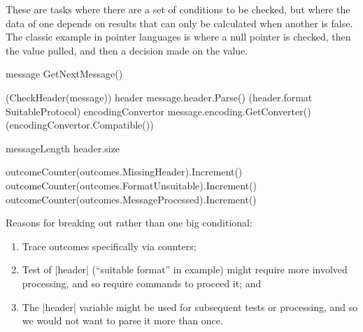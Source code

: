 \documentclass[10pt]{amsart}
\begin{document}
These are tasks where there are a set of conditions to be checked, but
where the data of one depends on results that can only be calculated
when another is false.  The classic example in pointer languages is
where a null pointer is checked, then the value pulled, and then a
decision made on the value.
\begin{codex}
\begin{offsideBlue}
\begin{PVerbatim}
  \ckw[block]\cop[:]
      message \cop[:=] GetNextMessage()

      \ckw[if] (\cop[!]CheckHeader(message))\cop[:]
          \cgoto\csituation[MissingHeader]
      \cend
      header \cop[:=] message.header.Parse()
      \ckw[if] (header.format \cop[!=] SuitableProtocol)\cop[:]
          \cgoto\csituation[FormatUnsuitable]
      \cend
      encodingConvertor \cop[:=] message.encoding.GetConverter()
      \ckw[if] (\cop[!]encodingConvertor.Compatible())\cop[:]
          \cgoto\csituation[FormatUnsuitable]
      \cend

      messageLength \cop[:=] header.size          

      \cgoto\csituation[MessageProcessed]

  \csitop\csituation[MissingHeader]\cop[:]
      outcomeCounter(outcomes.MissingHeader).Increment()
  \csitop\csituation[*.FormatUnsuitable]\cop[:]
      outcomeCounter(outcomes.FormatUnsuitable).Increment()
  \csitop\csituation[MessageProcessed]\cop[:]
      outcomeCounter(outcomes.MessageProcessed).Increment()
  \cend
\end{PVerbatim}
\end{offsideBlue}
\end{codex}
Reasons for breaking out rather than one big conditional:
\begin{enumerate}
\item Trace outcomes specifically via counters;
\item Test of |header| (``suitable format'' in example) might require
  more involved processing, and so require commands to proceed it; and
\item The |header| variable might be used for subsequent tests or
  processing, and so we would not want to parse it more than once.
\end{enumerate}
\end{document}

